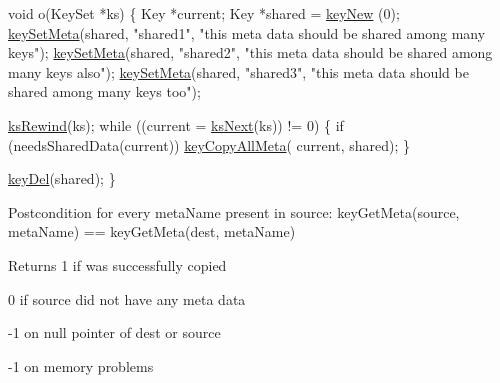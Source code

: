 \begin{DoxyCodeInclude}
\textcolor{keywordtype}{void} o(KeySet *ks)
\{
        Key *current;
        Key *shared = \hyperlink{group__key_gad23c65b44bf48d773759e1f9a4d43b89}{keyNew} (0);
        \hyperlink{group__keymeta_gae1f15546b234ffb6007d8a31178652b9}{keySetMeta}(shared, \textcolor{stringliteral}{"shared1"}, \textcolor{stringliteral}{"this meta data should be
       shared among many keys"});
        \hyperlink{group__keymeta_gae1f15546b234ffb6007d8a31178652b9}{keySetMeta}(shared, \textcolor{stringliteral}{"shared2"}, \textcolor{stringliteral}{"this meta data should be
       shared among many keys also"});
        \hyperlink{group__keymeta_gae1f15546b234ffb6007d8a31178652b9}{keySetMeta}(shared, \textcolor{stringliteral}{"shared3"}, \textcolor{stringliteral}{"this meta data should be
       shared among many keys too"});

        \hyperlink{group__keyset_gabe793ff51f1728e3429c84a8a9086b70}{ksRewind}(ks);
        \textcolor{keywordflow}{while} ((current = \hyperlink{group__keyset_ga317321c9065b5a4b3e33fe1c399bcec9}{ksNext}(ks)) != 0)
        \{
                \textcolor{keywordflow}{if} (needsSharedData(current)) \hyperlink{group__keymeta_ga8e63720a65610a29597494d0671f9401}{keyCopyAllMeta}(
      current, shared);
        \}

        \hyperlink{group__key_ga3df95bbc2494e3e6703ece5639be5bb1}{keyDel}(shared);
\}
\end{DoxyCodeInclude}
 \begin{DoxyPostcond}{Postcondition}
for every meta\-Name present in source\-: key\-Get\-Meta(source, meta\-Name) == key\-Get\-Meta(dest, meta\-Name)
\end{DoxyPostcond}
\begin{DoxyReturn}{Returns}
1 if was successfully copied 

0 if source did not have any meta data 

-\/1 on null pointer of dest or source 

-\/1 on memory problems 
\end{DoxyReturn}


